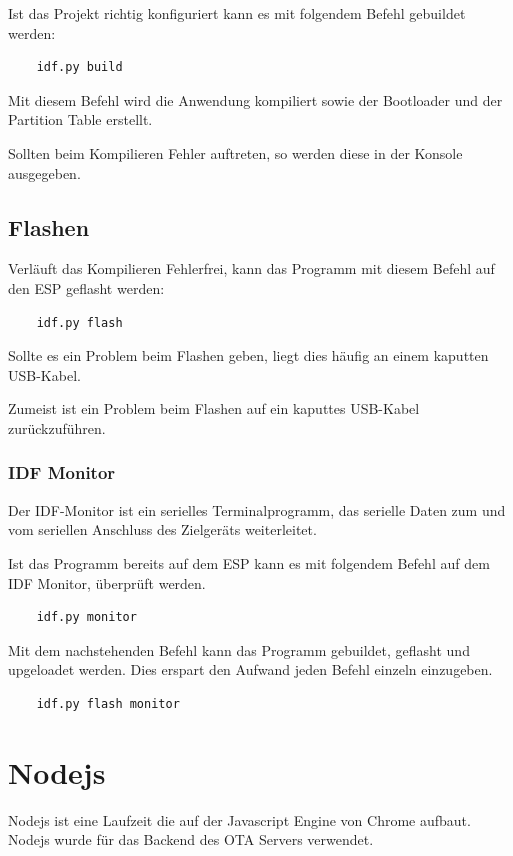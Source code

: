 Ist das Projekt richtig konfiguriert kann es mit folgendem Befehl gebuildet werden:
\begin{verbatim}
    idf.py build
\end{verbatim}

Mit diesem Befehl wird die Anwendung kompiliert sowie der Bootloader und der Partition Table erstellt.

Sollten beim Kompilieren Fehler auftreten, so werden diese in der Konsole ausgegeben.

\subsection{Flashen}
Verläuft das Kompilieren Fehlerfrei, kann das Programm mit diesem Befehl auf den ESP geflasht werden:
\begin{verbatim}
    idf.py flash
\end{verbatim}

Sollte es ein Problem beim Flashen geben, liegt dies häufig an einem kaputten USB-Kabel.

Zumeist ist ein Problem beim Flashen auf ein kaputtes USB-Kabel zurückzuführen.

\subsubsection{IDF Monitor}\label{sec:monitor}
Der IDF-Monitor ist ein serielles Terminalprogramm, das serielle Daten zum und vom seriellen Anschluss des Zielgeräts weiterleitet.

Ist das Programm bereits auf dem ESP kann es mit folgendem Befehl auf dem IDF Monitor, überprüft werden.

\begin{verbatim}
    idf.py monitor
\end{verbatim}

Mit dem nachstehenden Befehl kann das Programm gebuildet, geflasht und upgeloadet werden. Dies erspart den Aufwand jeden Befehl einzeln einzugeben.

\begin{verbatim}
    idf.py flash monitor
\end{verbatim}

\section{Nodejs}\label{sec:nodejs}

Nodejs ist eine Laufzeit die auf der Javascript Engine von Chrome aufbaut. Nodejs wurde für das Backend des OTA Servers verwendet.

